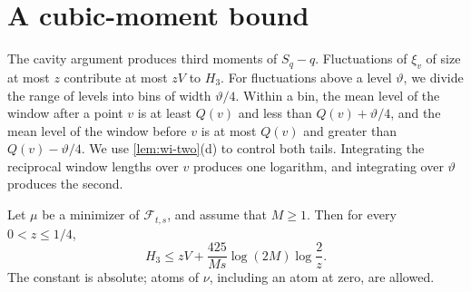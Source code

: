 \section{A cubic-moment bound}\label{sec:wi-cubic}

The cavity argument produces third moments of $S_q-q$. Fluctuations of
$\xi_v$ of size at most $z$ contribute at most $zV$ to $H_3$. For
fluctuations above a level $\vartheta$, we divide the range of levels
into bins of width $\vartheta/4$. Within a bin, the mean level of the
window after a point $v$ is at least $Q(v)$ and less than
$Q(v)+\vartheta/4$, and the mean level of the window before $v$ is at
most $Q(v)$ and greater than $Q(v)-\vartheta/4$. We use \cref{lem:wi-two}(d) to control both tails. Integrating
the reciprocal window lengths over $v$ produces one logarithm, and
integrating over $\vartheta$ produces the second.

\begin{corollary}\label{cor:wi-cub}
Let $\mu$ be a minimizer of $\mathcal F_{t,s}$, and assume that $M\ge1$.
Then for every $0<z\le1/4$,
\begin{equation}\label{eq:wi-cub}
 H_3\le zV+\frac{425}{Ms}\log(2M)\log\frac2z .
\end{equation}
The constant is absolute; atoms of $\nu$, including an atom at zero, are
allowed.
\end{corollary}

